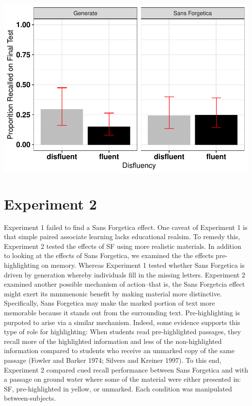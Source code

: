 \documentclass[pdf]{apa6}
\begin{document}
\includegraphics{SF_Paper_files/figure-latex/unnamed-chunk-1-1.pdf}

\hypertarget{experiment-2}{%
\section{Experiment 2}\label{experiment-2}}

Experiment 1 failed to find a Sans Forgetica effect. One caveat of Experiment 1 is that simple paired associate learning lacks educational realsim. To remedy this, Experiment 2 tested the effects of SF using more realistic materials. In addition to looking at the effects of Sans Forgetica, we examined the the effects pre-highlighting on memory. Whereas Experiment 1 tested whether Sans Forgetica is driven by generation whereby individuals fill in the missing letters. Experiment 2 examined another possible mechanism of action--that is, the Sans Forgetcia effect might exert its mnnmenonic benefit by making material more distinctive. Specifically, Sans Forgetica may make the marked portion of text more memorable because it stands
out from the surrounding text. Pre-highlighting is purpoted to arise via a similar mechanism. Indeed, some evidence supports this type of role for highlighting: When students read pre-highlighted passages, they recall more of the highlighted information and less of the non-highlighted information compared to students who receive an unmarked copy of the same passage (Fowler and Barker 1974; Silvers and Kreiner 1997). To this end, Experiment 2 compared cued recall performance between Sans Forgetica and with a passage on ground water where some of the material were either presented in: SF, pre-highlighted in yellow, or unmarked. Each condition was manipulated between-subjects.
\end{document}
